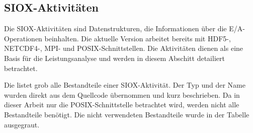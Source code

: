 





\subsection{SIOX-Aktivitäten}
Die SIOX-Aktivitäten sind Datenstrukturen, die Informationen über die E/A-Operationen beinhalten.
Die aktuelle Version arbeitet bereits mit HDF5-, NETCDF4-, MPI- und POSIX-Schnittstellen.
Die Aktivitäten dienen als eine Basis für die Leistungsanalyse und werden in diesem Abschitt detailiert betrachtet.

Die  listet grob alle Bestandteile einer SIOX-Aktivität.
Der Typ und der Name wurden direkt aus dem Quellcode übernommen und kurz beschrieben.
Da in dieser Arbeit nur die POSIX-Schnittstelle betrachtet wird, werden nicht alle Bestandteile benötigt.
Die nicht verwendeten Bestandteile wurde in der Tabelle ausgegraut.

